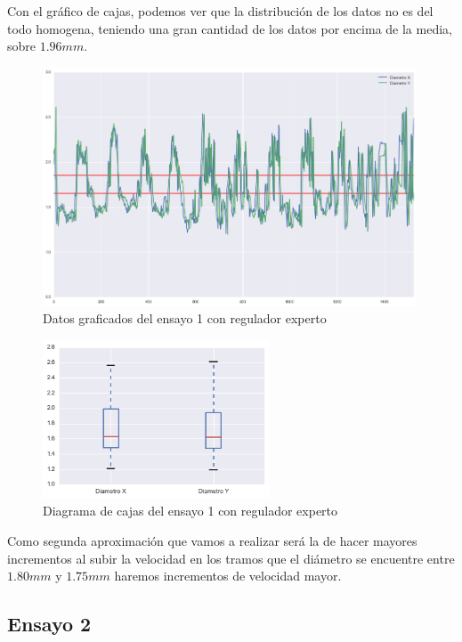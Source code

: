 Con el gráfico de cajas, podemos ver que la distribución de los datos no es del todo homogena, teniendo una gran cantidad de los datos por encima de la media, sobre $1.96 mm$.

\begin{figure}[H]
    \centering
    \includegraphics[width=0.99\textwidth]{images/producciones/11082015/output_9_1.png}
    \caption{Datos graficados del ensayo 1 con regulador experto}
    \label{fig:reg_graf1}
\end{figure}

\begin{figure}[H]
    \centering
    \includegraphics[width=0.6\textwidth]{images/producciones/11082015/output_10_1.png}
    \caption{Diagrama de cajas del ensayo 1 con regulador experto}
    \label{fig:reg_cajas1}
\end{figure}

Como segunda aproximación que vamos a realizar será la de hacer mayores incrementos al subir la velocidad en los tramos que el diámetro se encuentre entre $1.80 mm$ y $1.75 mm$ haremos incrementos de velocidad mayor.

\subsection{Ensayo 2}

